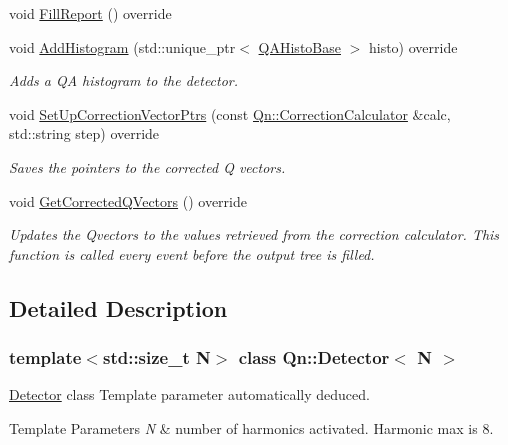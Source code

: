 \begin{DoxyCompactItemize}
void \mbox{\hyperlink{classQn_1_1Detector_a383267252d65877fa80fa7a0416e95bf}{Fill\+Report}} () override
\item 
void \mbox{\hyperlink{classQn_1_1Detector_a56d2dffc1f50b597edb95830f408b758}{Add\+Histogram}} (std\+::unique\+\_\+ptr$<$ \mbox{\hyperlink{structQn_1_1QAHistoBase}{Q\+A\+Histo\+Base}} $>$ histo) override
\begin{DoxyCompactList}\small\item\em Adds a QA histogram to the detector. \end{DoxyCompactList}\item 
void \mbox{\hyperlink{classQn_1_1Detector_aaaf2475cd8fa805dbca1fe22b72acdf5}{Set\+Up\+Correction\+Vector\+Ptrs}} (const \mbox{\hyperlink{classQn_1_1CorrectionCalculator}{Qn\+::\+Correction\+Calculator}} \&calc, std\+::string step) override
\begin{DoxyCompactList}\small\item\em Saves the pointers to the corrected Q vectors. \end{DoxyCompactList}\item 
\mbox{\label{classQn_1_1Detector_a2d4f2a8e934ee6b89ac22f00adfca53d}} 
void \mbox{\hyperlink{classQn_1_1Detector_a2d4f2a8e934ee6b89ac22f00adfca53d}{Get\+Corrected\+Q\+Vectors}} () override
\begin{DoxyCompactList}\small\item\em Updates the Qvectors to the values retrieved from the correction calculator. This function is called every event before the output tree is filled. \end{DoxyCompactList}\end{DoxyCompactItemize}


\subsection{Detailed Description}
\subsubsection*{template$<$std\+::size\+\_\+t N$>$\newline
class Qn\+::\+Detector$<$ N $>$}

\mbox{\hyperlink{classQn_1_1Detector}{Detector}} class Template parameter automatically deduced. 
\begin{DoxyTemplParams}{Template Parameters}
{\em N} & number of harmonics activated. Harmonic max is 8. \\
\hline
\end{DoxyTemplParams}


